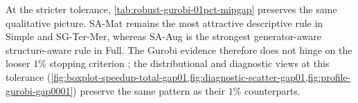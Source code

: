 \documentclass[AMA,Times1COL]{WileyNJDv5} %
\newcommand{\methodAug}{SA-Aug}
\newcommand{\methodMat}{SA-Mat}
\newcommand{\methodRuiz}{Ruiz}
\newcommand{\methodRuizCols}{Ruiz+Cols}
\providecommand{\DIFadd}[1]{{\protect\color{blue} \sf #1}} %
\providecommand{\DIFdel}[1]{{\protect\color{red} \scriptsize #1}} %
\providecommand{\DIFaddbegin}{} %
\providecommand{\DIFaddend}{} %
\providecommand{\DIFdelbegin}{} %
\providecommand{\DIFdelend}{} %
\begin{document}
\noindent At the stricter tolerance, \cref{tab:robust-gurobi-01pct-mipgap} preserves the same qualitative picture. \methodMat{} remains the most attractive descriptive rule in Simple and SG-Ter-Mer, whereas \methodAug{} is the strongest \DIFdelbegin \DIFdel{generator-aware }\DIFdelend \DIFaddbegin \DIFadd{structure-aware }\DIFaddend rule in Full. The Gurobi evidence therefore does not hinge on the looser $1\%$ stopping criterion\DIFaddbegin \DIFadd{; the distributional and diagnostic views at this tolerance (\cref{fig:boxplot-speedup-total-gap01,fig:diagnostic-scatter-gap01,fig:profile-gurobi-gap0001}) preserve the same pattern as their $1\%$ counterparts}\DIFaddend .


\DIFdelbegin %
\end{document}
